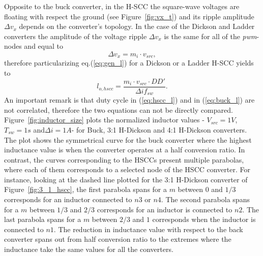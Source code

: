 Opposite to the buck converter, in the H-SCC the square-wave voltages are floating with respect the ground (see Figure~\ref{fig:vx_t}) and its ripple amplitude $\Delta v_x$ depends on the converter's topology. In the case of the Dickson and Ladder converters the amplitude of the voltage ripple $\Delta v_x$ is the same for all of the \emph{pwm}-nodes and equal to
\begin{equation}
 \Delta v_x   = m_i \cdot v_{src},
\label{eq:h_scc_Del_vx}
\end{equation}
therefore particularizing eq.(\ref{eq:gen_l}) for a Dickson or a Ladder H-SCC yields to
\begin{equation}
 l_{o,hscc}  = \frac{ m_i \cdot v_{src} \cdot DD'}{\Delta i f_{sw} }.
\label{eq:hscc_l}
\end{equation}
An important remark is that duty cycle in (\ref{eq:hscc_l}) and in (\ref{eq:buck_l}) are not correlated, therefore the two equations can not be directly compared.  Figure~\ref{fig:inductor_size} plots the normalized inductor values - $V_{src} = 1V$, $T_{sw}=1s$ and$\Delta i = 1A$- for Buck, 3:1 H-Dickson and 4:1 H-Dickson converters. The plot shows the symmetrical curve for the buck converter where the highest inductance value is when the converter operates at a half conversion ratio.
In contrast, the curves corresponding to the HSCCs present multiple parabolas, where each of them corresponds to a selected node of the HSCC converter. For instance, looking at the dashed line plotted for the 3:1 H-Dickson converter of Figure~\ref{fig:3_1_hscc}, the first parabola spans for a $m$ between $0$ and $1/3$ corresponds for an inductor connected to $n3$ or $n4$. The second parabola spans for a $m$ between $1/3$ and $2/3$ corresponds for an inductor is connected to $n2$. The last parabola spans for a $m$ between $2/3$ and $1$ corresponds when the inductor is connected to $n1$.
The reduction in inductance value with respect to the back converter spans out from half conversion ratio to the extremes where the inductance take the same values for all the converters.


